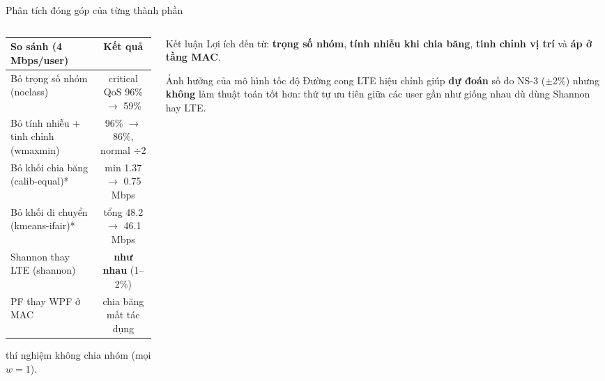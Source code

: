 \documentclass[aspectratio=169,10pt,t]{beamer}
\newcommand{\hl}[1]{\textcolor{MainBlue}{\textbf{#1}}}
\begin{document}
\begin{frame}{Phân tích đóng góp của từng thành phần}
\begin{columns}[T,onlytextwidth]
\begin{column}{0.52\textwidth}
\vspace{0pt}
  \small
  \begin{tabularx}{\linewidth}{@{}>{\raggedright\arraybackslash}Xc@{}}
    \toprule
    \textbf{So sánh (4 Mbps/user)} & \textbf{Kết quả}\\
    \midrule
    Bỏ trọng số nhóm (noclass) & critical QoS 96\% $\rightarrow$ \alert{59\%}\\
    Bỏ tính nhiễu + tinh chỉnh (wmaxmin) & 96\% $\rightarrow$ 86\%, normal $\div$2\\
    Bỏ khối chia băng (calib-equal)* & min 1.37 $\rightarrow$ 0.75 Mbps\\
    Bỏ khối di chuyển (kmeans-ifair)* & tổng 48.2 $\rightarrow$ 46.1 Mbps\\
    Shannon thay LTE (shannon) & \textbf{như nhau} (1--2\%)\\
    PF thay WPF ở MAC & chia băng mất tác dụng\\
    \bottomrule
  \end{tabularx}

  \scriptsize * thí nghiệm không chia nhóm (mọi $w=1$).
\end{column}
\begin{column}{0.44\textwidth}
\vspace{0pt}
  \begin{block}{Kết luận}
    \small
    Lợi ích đến từ: \hl{trọng số nhóm}, \hl{tính nhiễu khi chia băng}, \hl{tinh chỉnh vị trí} và \hl{áp ở tầng MAC}.
  \end{block}
  \begin{block}{Ảnh hưởng của mô hình tốc độ}
    \small
    Đường cong LTE hiệu chỉnh giúp \textbf{dự đoán} số đo NS-3 ($\pm$2\%) nhưng \textbf{không} làm thuật toán tốt hơn:
    thứ tự ưu tiên giữa các user gần như giống nhau dù dùng Shannon hay LTE.
  \end{block}
\end{column}
\end{columns}
\end{frame}
\end{document}
